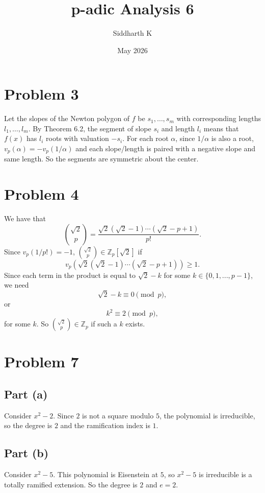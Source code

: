 \documentclass{article}
\title{p-adic Analysis 6}
\author{Siddharth K}
\date{May 2026}
\newcommand{\Z}{\mathbb{Z}}
\begin{document}
\maketitle

\section*{Problem 3}
Let the slopes of the Newton polygon of $f$ be $s_1, \ldots, s_m$ with corresponding lengths $l_1, \ldots, l_m$. By Theorem 6.2, the segment of slope $s_i$ and length $l_i$ means that $f(x)$ has $l_i$ roots with valuation $-s_i$. For each root $\alpha$, since $1/\alpha$ is also a root, $v_p(\alpha) = -v_p(1/\alpha)$ and each slope/length is paired with a negative slope and same length. So the segments are symmetric about the center.

\section*{Problem 4}
We have that
$$\binom{\sqrt 2}{p} = \frac{\sqrt{2}(\sqrt{2} - 1)\cdots (\sqrt{2} - p + 1)}{p!}.$$
Since $v_p(1/p!) = -1$, $\binom{\sqrt2}{p} \in \Z_p[\sqrt2]$ if
$$v_p(\sqrt{2}(\sqrt{2} - 1)\cdots (\sqrt{2} - p + 1)) \ge 1.$$
Since each term in the product is equal to $\sqrt{2} - k$ for some $k \in \{0, 1, ..., p - 1\}$, we need
$$\sqrt{2} - k \equiv 0 \pmod{p},$$
or
$$k^2 \equiv 2 \pmod{p},$$
for some $k$. So $\binom{\sqrt 2}{p} \in \Z_p$ if such a $k$ exists.

\section*{Problem 7}
\subsection*{Part (a)}
Consider $x^2 - 2$. Since $2$ is not a square modulo $5$, the polynomial is irreducible, so the degree is $2$ and the ramification index is $1$.

\subsection*{Part (b)}
Consider $x^2 - 5$. This polynomial is Eisenstein at $5$, so $x^2 - 5$ is irreducible is a totally ramified extension. So the degree is $2$ and $e = 2$.
\end{document}
